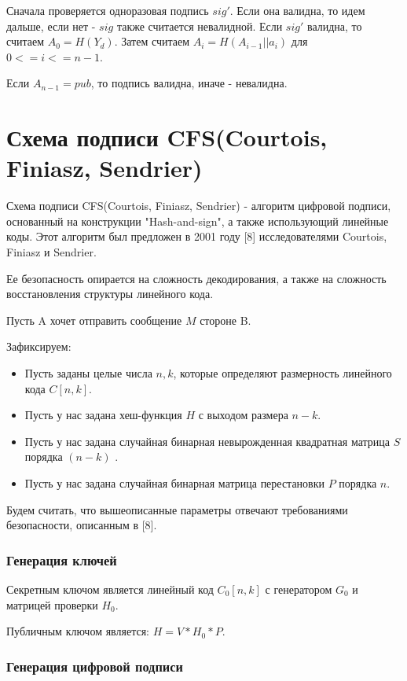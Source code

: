 \documentclass[colorthm]{./civarticle}
\begin{document}
Сначала проверяется одноразовая подпись $sig'$. Если она валидна, то идем дальше, если нет - $sig$ также считается невалидной. Если $sig'$ валидна, то считаем $A_0 = H(Y_d)$. Затем считаем $A_i = H(A_{i-1}||a_i)$ для $0<=i<=n-1$.

Если $A_{n-1} = pub$, то подпись валидна, иначе - невалидна.

\section{Схема подписи CFS(Courtois, Finiasz, Sendrier)}
Схема подписи CFS(Courtois, Finiasz, Sendrier) - алгоритм цифровой подписи, основанный на конструкции "Hash-and-sign", а также использующий линейные коды. Этот алгоритм был предложен в 2001 году [8] исследователями Courtois, Finiasz и Sendrier.

Ее безопасность опирается на сложность декодирования, а также на сложность восстановления структуры линейного кода.

Пусть A хочет отправить сообщение $M$ стороне B. 

Зафиксируем:

\begin{itemize}
    \item Пусть заданы целые числа $n,k$, которые определяют размерность линейного кода $C[n, k]$.
    \item Пусть у нас задана хеш-функция $H$ с выходом размера $n-k$.
    \item Пусть у нас задана случайная бинарная невырожденная квадратная матрица $S$ порядка $(n-k)$ .
    \item Пусть у нас задана случайная бинарная матрица перестановки $P$ порядка $n$.
\end{itemize} 

Будем считать, что вышеописанные параметры отвечают требованиями безопасности, описанным в [8].
 
\subsubsection{Генерация ключей}

Секретным ключом является линейный код $C_0[n, k]$ с генератором $G_0$ и матрицей проверки $H_0$.

Публичным ключом является: $H=V*H_0*P$.

\subsubsection{Генерация цифровой подписи}
\end{document}
